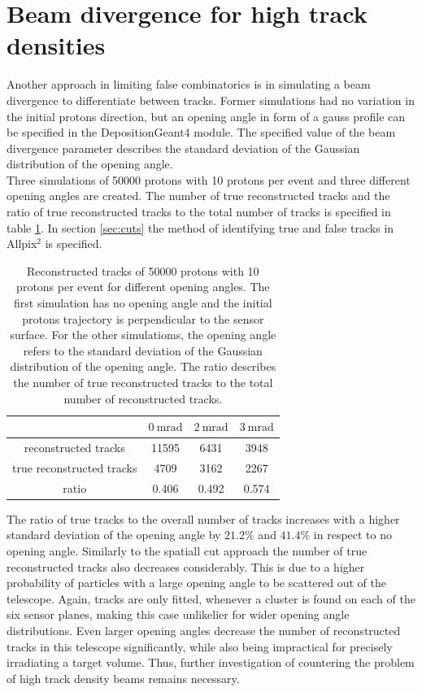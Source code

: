 \section{Beam divergence for high track densities}
Another approach in limiting false combinatorics is in simulating a beam divergence to differentiate between tracks. Former simulations had no variation
in the initial protons direction, but an opening angle in form of a gauss profile can be specified in the DepositionGeant4 module. The specified value of
the beam divergence parameter describes the standard deviation of the Gaussian distribution of the opening angle.  \\
Three simulations of 50000 protons with 10 protons per event and three different opening angles are created.
The number of true reconstructed tracks and the ratio
of true reconstructed tracks to the total number of tracks is specified in table \ref{tab:angle}. In section \ref{sec:cuts} the method of identifying
true and false tracks in Allpix$^2$ is specified.

\begin{table}
  \centering
  \begin{tabular}{c | c c c}
    \toprule
     &  $\SI{0}{\milli\radian}$ & $\SI{2}{\milli\radian}$ & $\SI{3}{\milli\radian}$\\
    \midrule
    reconstructed tracks & 11595 & 6431 & 3948  \\
    true reconstructed tracks & 4709 & 3162 & 2267 \\
    ratio & 0.406 & 0.492 & 0.574
  \end{tabular}
  \caption{Reconstructed tracks of 50000 protons with 10 protons per event for different opening angles. The first simulation has no opening angle and the initial protons
  trajectory is perpendicular to the sensor surface. For the other simulatioms, the opening angle refers to the standard deviation of the Gaussian distribution of
  the opening angle. The ratio describes the number of true reconstructed tracks to the total number of reconstructed tracks.}
  \label{tab:angle}
\end{table}

The ratio of true tracks to the overall number of tracks increases with a higher standard deviation of the opening angle by $21.2\%$ and $41.4\%$ in respect to
no opening angle. Similarly to the spatiall cut approach the
number of true reconstructed tracks also decreases considerably. This is due to a higher probability of particles with a large opening angle to be scattered out of the telescope.
Again, tracks are only fitted, whenever a cluster is found on each of the six sensor planes, making this case unlikelier for wider opening angle distributions.
Even larger opening angles decrease the number of reconstructed tracks in this telescope significantly, while also being impractical for precisely irradiating a target volume.
Thus, further investigation of countering the problem of high track density beams remains necessary.

